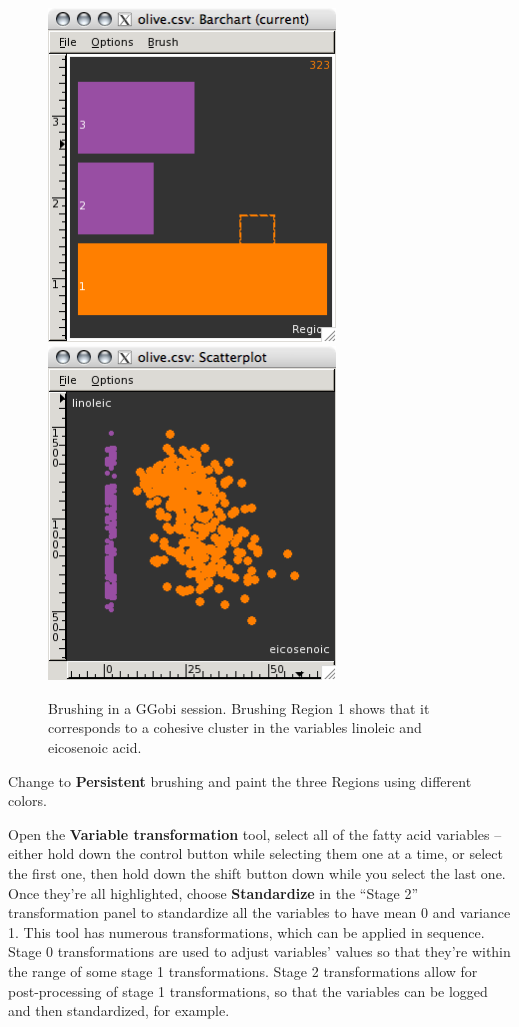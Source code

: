 \documentclass[11pt]{article}
\def\Widget#1{\textbf{#1}}
\begin{document}
\begin{figure}[htp]
\centerline{\includegraphics[width=3in]{Figures/olive-brush1.png}
      \includegraphics[width=3in]{Figures/olive-brush2.png}
}
\caption{Brushing in a GGobi session. Brushing Region 1 shows that it
corresponds to a cohesive cluster in the variables linoleic and 
eicosenoic acid.
}
\label{fig3}
\end{figure}

Change to \Widget{Persistent} brushing and paint the three Regions
using different colors. 

Open the \Widget{Variable transformation} tool, select all of the fatty
acid variables -- either hold down the control button while selecting
them one at a time, or select the first one, then hold down the
shift button down while you select the last one.  Once they're all
highlighted, choose \Widget{Standardize} in the ``Stage 2'' transformation
panel to standardize all the variables to have mean 0 and variance 1.
This tool has numerous transformations, which can be applied in sequence.
Stage 0 transformations are used to adjust variables' values so that
they're within the range of some stage 1 transformations. Stage 2
transformations allow for post-processing of stage 1 transformations,
so that the variables can be logged and then standardized, for example.
\end{document}
